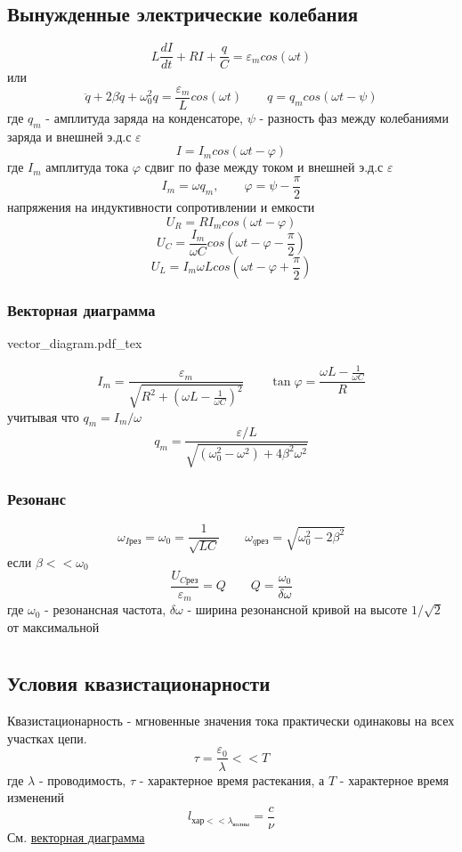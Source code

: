 \documentclass{article}
\newcommand{\incfig}[2][1]{%
    \def\svgwidth{#1\columnwidth}
    {#2.pdf_tex}
}
\begin{document}
\subsection{Вынужденные электрические колебания}
\[L\frac{dI}{dt} + RI + \frac{q}{C} = \varepsilon_m cos(\omega t)\]
или
\[\ddot{q} + 2\beta\dot{q} + \omega_0^2 q = \frac{\varepsilon_m}{L} cos(\omega t) \qquad q = q_m cos(\omega t - \psi)\]
где $q_m$ - амплитуда заряда на конденсаторе, $\psi$ - разность фаз между колебаниями заряда и внешней э.д.с $\varepsilon$
\[I = I_m cos (\omega t - \varphi)\]
где $I_m$ амплитуда тока $\varphi$ сдвиг по фазе между током и внешней э.д.с $\varepsilon$
\[I_m = \omega q_m, \qquad \varphi = \psi - \frac{\pi}{2}\]
напряжения на индуктивности сопротивлении и емкости
\[U_R = RI_mcos(\omega t - \varphi)\]
\[U_C = \frac{I_m}{\omega C} cos(\omega t - \varphi - \frac{\pi}{2})\]
\[U_L = {I_m\omega L} cos(\omega t - \varphi + \frac{\pi}{2})\]
\subsubsection{Векторная диаграмма} \label{sec:vecdiag}
\incfig{vector_diagram}
\[I_m = \frac{\varepsilon_m}{\sqrt{R^2 + (\omega L - \frac{1}{\omega C})^2}} \qquad \tan \varphi = \frac{\omega L - \frac{1}{\omega C}}{R}\]
учитывая что $q_m=I_m/\omega$
\[q_m=\frac{\varepsilon/L}{\sqrt{(\omega_0^2-\omega^2)+4\beta^2\omega^2}}\]
\subsubsection{Резонанс}
\[\omega_{I\text{рез}} = \omega_0 = \frac{1}{\sqrt{LC}} \qquad \omega_{q\text{рез}} = \sqrt{\omega_0^2 - 2\beta^2}\]
если $\beta << \omega_0$
\[\frac{U_{C\text{рез}}}{\varepsilon_m} = Q \qquad Q = \frac{\omega_0}{\delta \omega}\]
где $\omega_0$ - резонансная частота, $\delta \omega$ - ширина резонансной кривой на высоте $1/\sqrt{2}$ от максимальной


\section{}
\subsection{Условия квазистационарности}
Квазистационарность - мгновенные значения тока практически одинаковы на всех участках цепи.
\[\tau=\frac{\varepsilon_0}{\lambda} << T\]
где $\lambda$ - проводимость, $\tau$ - характерное время растекания, а $T$ - характерное время изменений
\[l_{\text{хар}<<\lambda_{\text{волны}}}=\frac{c}{\nu}\]
См. \hyperref[sec:vecdiag]{векторная диаграмма}
\end{document}
